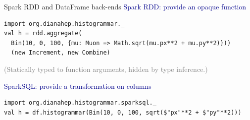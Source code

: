 \documentclass[aspectratio=169]{beamer}
\begin{document}
\begin{frame}[fragile]{Spark RDD and DataFrame back-ends}
\vspace{0.25 cm}
\textcolor{darkblue}{\large Spark RDD: provide an opaque function}


\vspace{-0.25 cm}
\small
\begin{verbatim}
import org.dianahep.histogrammar._
val h = rdd.aggregate(
  Bin(10, 0, 100, {mu: Muon => Math.sqrt(mu.px**2 + mu.py**2)}))
  (new Increment, new Combine)
\end{verbatim}

\textcolor{gray}{(Statically typed to function arguments, hidden by type inference.)}


\vspace{1.3 cm}
\textcolor{darkblue}{\large SparkSQL: provide a transformation on columns}


\vspace{-0.25 cm}
\small
\begin{verbatim}
import org.dianahep.histogrammar.sparksql._
val h = df.histogrammar(Bin(10, 0, 100, sqrt($"px"**2 + $"py"**2)))
\end{verbatim}
\end{frame}
\end{document}
